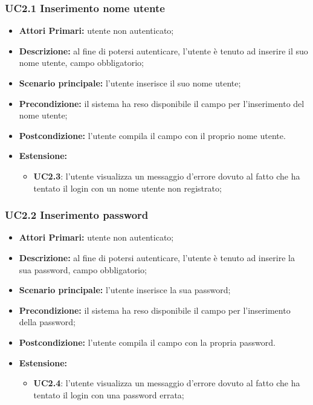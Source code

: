 \subsubsection{UC2.1 Inserimento nome utente}
\begin{itemize}
	\item \textbf{Attori Primari:} utente non autenticato;
	\item \textbf{Descrizione:} al fine di potersi autenticare, l'utente è tenuto ad inserire il suo nome utente, campo obbligatorio;
	\item \textbf{Scenario principale:} l'utente inserisce il suo nome utente;
	\item \textbf{Precondizione:} il sistema ha reso disponibile il campo per l'inserimento del nome utente;
	\item \textbf{Postcondizione:} l'utente compila il campo con il proprio nome utente.
	\item \textbf{Estensione:}
	\begin{itemize}
		\item \textbf{UC2.3}: l'utente visualizza un messaggio d'errore dovuto al fatto che ha tentato il login con un nome utente non registrato;
	\end{itemize}
\end{itemize}	

\subsubsection{UC2.2 Inserimento password}
\begin{itemize}
	\item \textbf{Attori Primari:} utente non autenticato;
	\item \textbf{Descrizione:} al fine di potersi autenticare, l'utente è tenuto ad inserire la sua password, campo obbligatorio;
	\item \textbf{Scenario principale:} l'utente inserisce la sua password;
	\item \textbf{Precondizione:} il sistema ha reso disponibile il campo per l'inserimento della password;
	\item \textbf{Postcondizione:} l'utente compila il campo con la propria password.
	\item \textbf{Estensione:}
	\begin{itemize}
		\item \textbf{UC2.4}: l'utente visualizza un messaggio d'errore dovuto al fatto che ha tentato il login con una password errata;
	\end{itemize}
\end{itemize}	


